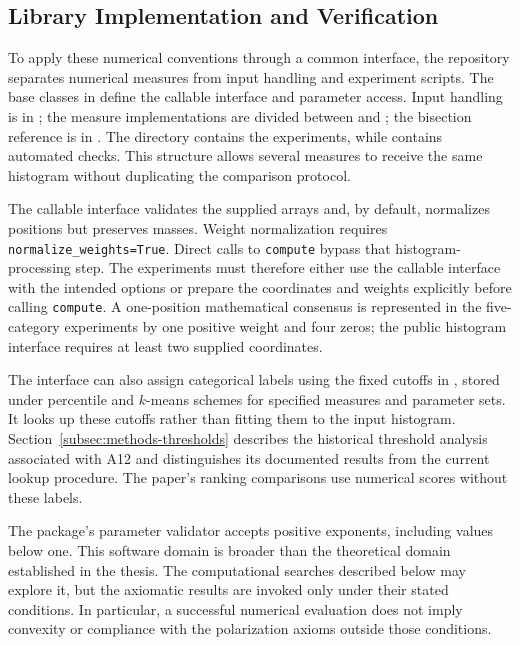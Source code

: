 \documentclass{article}
\theoremstyle{plain}
\theoremstyle{remark}
\begin{document}
\subsection{Library Implementation and Verification}\label{subsec:methods-software}

To apply these numerical conventions through a common interface, the repository separates numerical measures from input handling and experiment scripts. The base classes in  define the callable interface and parameter access. Input handling is in ; the measure implementations are divided between  and ; the bisection reference is in . The  directory contains the experiments, while  contains automated checks. This structure allows several measures to receive the same histogram without duplicating the comparison protocol.

The callable interface validates the supplied arrays and, by default, normalizes positions but preserves masses. Weight normalization requires \texttt{normalize\_\allowbreak weights=True}. Direct calls to \texttt{compute} bypass that histogram-processing step. The experiments must therefore either use the callable interface with the intended options or prepare the coordinates and weights explicitly before calling \texttt{compute}. A one-position mathematical consensus is represented in the five-category experiments by one positive weight and four zeros; the public histogram interface requires at least two supplied coordinates.

The interface can also assign categorical labels using the fixed cutoffs in , stored under percentile and $k$-means schemes for specified measures and parameter sets. It looks up these cutoffs rather than fitting them to the input histogram. Section~\ref{subsec:methods-thresholds} describes the historical threshold analysis associated with A12 and distinguishes its documented results from the current lookup procedure. The paper's ranking comparisons use numerical scores without these labels.

The package's parameter validator accepts positive exponents, including values below one. This software domain is broader than the theoretical domain established in the thesis. The computational searches described below may explore it, but the axiomatic results are invoked only under their stated conditions. In particular, a successful numerical evaluation does not imply convexity or compliance with the polarization axioms outside those conditions.
\end{document}
